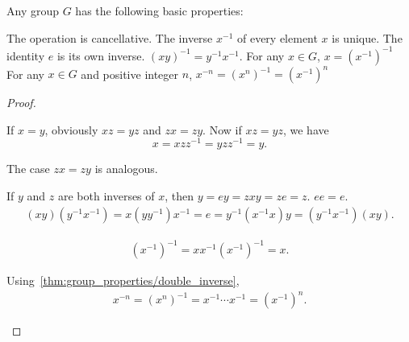 \begin{proposition}\label{thm:group_properties}
  Any group \( G \) has the following basic properties:
  \begin{thmenum}
     The operation is cancellative.
     The inverse \( x^{-1} \) of every element \( x \) is unique.
     The identity \( e \) is its own inverse.
     \( (xy)^{-1} = y^{-1} x^{-1} \).
     For any \( x \in G \), \( x = (x^{-1})^{-1} \)
     For any \( x \in G \) and positive integer \( n \), \( x^{-n} = (x^n)^{-1} = (x^{-1})^n \)
  \end{thmenum}
\end{proposition}
\begin{proof}\mbox{}
  \begin{itemize}
     If \( x = y \), obviously \( xz = yz \) and \( zx = zy \). Now if \( xz = yz \), we have
    \begin{equation*}
      x = xzz^{-1} = yzz^{-1} = y.
    \end{equation*}

    The case \( zx = zy \) is analogous.

     If \( y \) and \( z \) are both inverses of \( x \), then \( y = ey = zxy = ze = z \).
     \( ee = e \).
    \begin{align*}
      (xy) (y^{-1} x^{-1})
      =
      x (y y^{-1}) x^{-1}
      =
      e
      =
      y^{-1} (x^{-1} x) y
      =
      (y^{-1} x^{-1}) (xy).
    \end{align*}

    \begin{align*}
      (x^{-1})^{-1}
      =
      x x^{-1} (x^{-1})^{-1}
      =
      x.
    \end{align*}

     Using~\ref{thm:group_properties/double_inverse},
    \begin{align*}
      x^{-n}
      =
      (x^n)^{-1}
      =
      x^{-1} \cdots x^{-1}
      =
      (x^{-1})^n.
    \end{align*}
  \end{itemize}
\end{proof}

